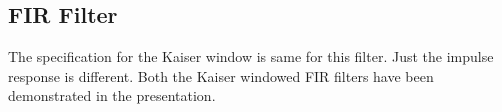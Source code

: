 \documentclass[12pt,a4paper]{scrartcl}
\begin{document}
		\subsection{FIR Filter}
			The specification for the Kaiser window is same for this filter. Just the impulse response is different. Both the Kaiser windowed FIR filters have been demonstrated in the presentation.
\end{document}

